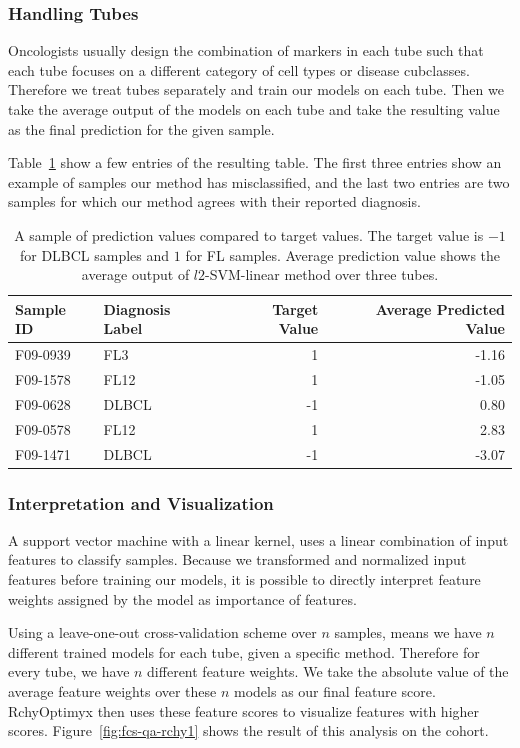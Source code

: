 \subsubsection{Handling Tubes}
Oncologists usually design the combination of markers in each tube such that each tube focuses on a different category of cell types or disease cubclasses. Therefore we treat tubes separately and train our models on each tube. Then we take the average output of the models on each tube and take the resulting value as the final prediction for the given sample.

Table~\ref{fig:fcs-qa-matchcount} show a few entries of the resulting table. The first three entries show an example of samples our method has misclassified, and the last two entries are two samples for which our method agrees with their reported diagnosis.

\begin{table}[!ht]
  \centering
  \begin{tabular}{llrr}
    Sample ID & Diagnosis Label & Target Value & Average Predicted Value \\ \hline
    F09-0939 & FL3 & 1 & -1.16 \\
    F09-1578 & FL12 & 1 & -1.05 \\
    F09-0628 & DLBCL & -1 & 0.80 \\
    F09-0578 & FL12 & 1 & 2.83 \\
    F09-1471 & DLBCL & -1 & -3.07
  \end{tabular}
  \caption{A sample of prediction values compared to target values. The target value is $-1$ for DLBCL samples and $1$ for FL samples. Average prediction value shows the average output of $l2$-SVM-linear method over three tubes.}
  \label{fig:fcs-qa-matchcount}
\end{table}


\subsubsection{Interpretation and Visualization}
A support vector machine with a linear kernel, uses a linear combination of input features to classify samples. Because we transformed and normalized input features before training our models, it is possible to directly interpret feature weights assigned by the model as importance of features.

Using a leave-one-out cross-validation scheme over $n$ samples, means we have $n$ different trained models for each tube, given a specific method. Therefore for every tube, we have $n$ different feature weights. We take the absolute value of the average feature weights over these $n$ models as our final feature score. RchyOptimyx then uses these feature scores to visualize features with higher scores. Figure~\ref{fig:fcs-qa-rchy1} shows the result of this analysis on the cohort.

